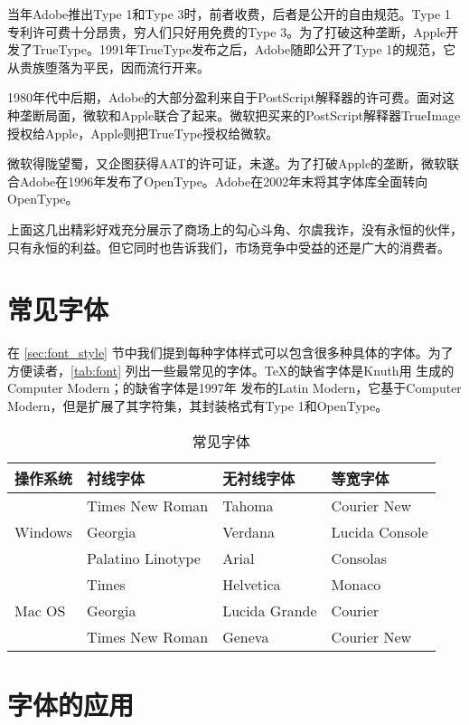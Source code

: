 当年Adobe\indexAdobe{}推出Type 1和Type 3时，前者收费，后者是公开的自由规范。Type 1专利许可费十分昂贵，穷人们只好用免费的Type 3。为了打破这种垄断，Apple开发了TrueType。1991年TrueType发布之后，Adobe随即公开了Type 1的规范，它从贵族堕落为平民，因而流行开来。

1980年代中后期，Adobe的大部分盈利来自于PostScript解释器的许可费。面对这种垄断局面，微软和Apple联合了起来。微软把买来的PostScript解释器TrueImage授权给Apple，Apple则把TrueType授权给微软。

微软得陇望蜀，又企图获得AAT的许可证，未遂。为了打破Apple的垄断，微软联合Adobe在1996年发布了OpenType。Adobe在2002年末将其字体库全面转向OpenType。

上面这几出精彩好戏充分展示了商场上的勾心斗角、尔虞我诈，没有永恒的伙伴，只有永恒的利益。但它同时也告诉我们，市场竞争中受益的还是广大的消费者。

\section{常见字体}

在 \ref{sec:font_style} 节中我们提到每种字体样式可以包含很多种具体的字体。为了方便读者，\autoref{tab:font} 列出一些最常见的字体。\TeX 的缺省字体是Knuth用 \MF 生成的Computer Modern；\XeTeX 的缺省字体是1997年 \AmS 发布的Latin Modern，它基于Computer Modern，但是扩展了其字符集，其封装格式有Type 1和OpenType。

\begin{table}[htbp]
\caption{常见字体}
\label{tab:font}
\centering
\begin{tabular}{llll}
    \toprule
    操作系统 & 衬线字体        & 无衬线字体 & 等宽字体 \\
    \midrule
    \multirow{3}{*}{Windows}   
             & Times New Roman & Tahoma     & Courier New \\
             & Georgia         & Verdana    & Lucida Console \\
             & Palatino Linotype & Arial    & Consolas \\
    \midrule
    \multirow{3}{*}{Mac OS}   
             & Times           & Helvetica  & Monaco \\
             & Georgia         & Lucida Grande & Courier \\
             & Times New Roman & Geneva     & Courier New \\
    \bottomrule
\end{tabular}
\end{table}

\section{字体的应用}

